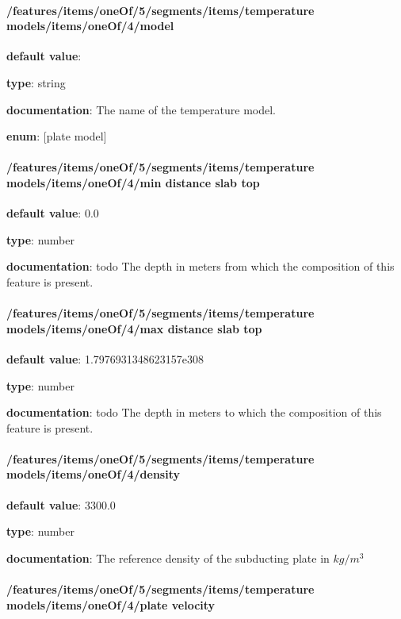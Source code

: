 \paragraph{/features/items/oneOf/5/segments/items/temperature models/items/oneOf/4/model} \begin{itemized}
\item {\bf default value}: 
\item {\bf type}: string
\item {\bf documentation}: The name of the temperature model.
\item {\bf enum}: [plate model]\end{itemized}\paragraph{/features/items/oneOf/5/segments/items/temperature models/items/oneOf/4/min distance slab top} \begin{itemized}
\item {\bf default value}: 0.0
\item {\bf type}: number
\item {\bf documentation}: todo The depth in meters from which the composition of this feature is present.
\end{itemized}\paragraph{/features/items/oneOf/5/segments/items/temperature models/items/oneOf/4/max distance slab top} \begin{itemized}
\item {\bf default value}: 1.7976931348623157e308
\item {\bf type}: number
\item {\bf documentation}: todo The depth in meters to which the composition of this feature is present.
\end{itemized}\paragraph{/features/items/oneOf/5/segments/items/temperature models/items/oneOf/4/density} \begin{itemized}
\item {\bf default value}: 3300.0
\item {\bf type}: number
\item {\bf documentation}: The reference density of the subducting plate in $kg/m^3$
\end{itemized}\paragraph{/features/items/oneOf/5/segments/items/temperature models/items/oneOf/4/plate velocity} \begin{itemized}

\end{itemized}
